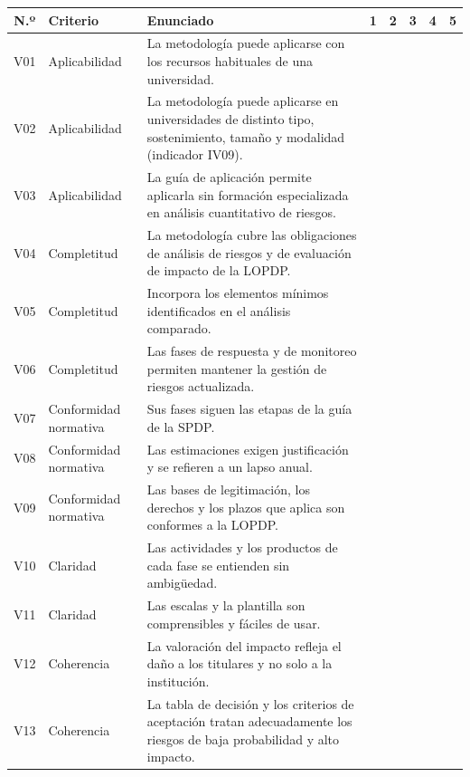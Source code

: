 \begin{center}
\footnotesize
\renewcommand{\arraystretch}{1.25}
\begin{tabularx}{\textwidth}{|c|p{2.3cm}|L|c|c|c|c|c|}
  \hline
  \textbf{N.º} & \textbf{Criterio} & \textbf{Enunciado} & \textbf{1} & \textbf{2} & \textbf{3} & \textbf{4} & \textbf{5} \\
  \hline
  V01 & Aplicabilidad & La metodología puede aplicarse con los recursos habituales de una universidad. & & & & & \\ \hline
  V02 & Aplicabilidad & La metodología puede aplicarse en universidades de distinto tipo, sostenimiento, tamaño y modalidad (indicador IV09). & & & & & \\ \hline
  V03 & Aplicabilidad & La guía de aplicación permite aplicarla sin formación especializada en análisis cuantitativo de riesgos. & & & & & \\ \hline
  V04 & Completitud & La metodología cubre las obligaciones de análisis de riesgos y de evaluación de impacto de la LOPDP. & & & & & \\ \hline
  V05 & Completitud & Incorpora los elementos mínimos identificados en el análisis comparado. & & & & & \\ \hline
  V06 & Completitud & Las fases de respuesta y de monitoreo permiten mantener la gestión de riesgos actualizada. & & & & & \\ \hline
  V07 & Conformidad normativa & Sus fases siguen las etapas de la guía de la SPDP. & & & & & \\ \hline
  V08 & Conformidad normativa & Las estimaciones exigen justificación y se refieren a un lapso anual. & & & & & \\ \hline
  V09 & Conformidad normativa & Las bases de legitimación, los derechos y los plazos que aplica son conformes a la LOPDP. & & & & & \\ \hline
  V10 & Claridad & Las actividades y los productos de cada fase se entienden sin ambigüedad. & & & & & \\ \hline
  V11 & Claridad & Las escalas y la plantilla son comprensibles y fáciles de usar. & & & & & \\ \hline
  V12 & Coherencia & La valoración del impacto refleja el daño a los titulares y no solo a la institución. & & & & & \\ \hline
  V13 & Coherencia & La tabla de decisión y los criterios de aceptación tratan adecuadamente los riesgos de baja probabilidad y alto impacto. & & & & & \\ \hline
\end{tabularx}
\end{center}

